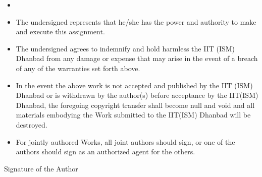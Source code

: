 \begin{itemize}
\item[] 
    \renewcommand{\labelitemi}{\textasteriskcentered} %
    \item The undersigned represents that he/she has the power and authority to make and execute this assignment.
    \item The undersigned agrees to indemnify and hold harmless the IIT (ISM) Dhanbad from any damage or expense that may arise in the event of a breach of any of the warranties set forth above.
    \item  In the event the above work is not accepted and published by the IIT (ISM) Dhanbad or is withdrawn by the author(s) before acceptance by the IIT(ISM) Dhanbad, the foregoing copyright transfer shall become null and void and all materials embodying the Work submitted to the IIT(ISM) Dhanbad will be destroyed.
    \item For jointly authored Works, all joint authors should sign, or one of the authors should sign as an authorized agent for the others. 
\end{itemize}

\vspace{0.5cm}

\begin{flushright}
    {Signature of the Author} %
\end{flushright}

% 
